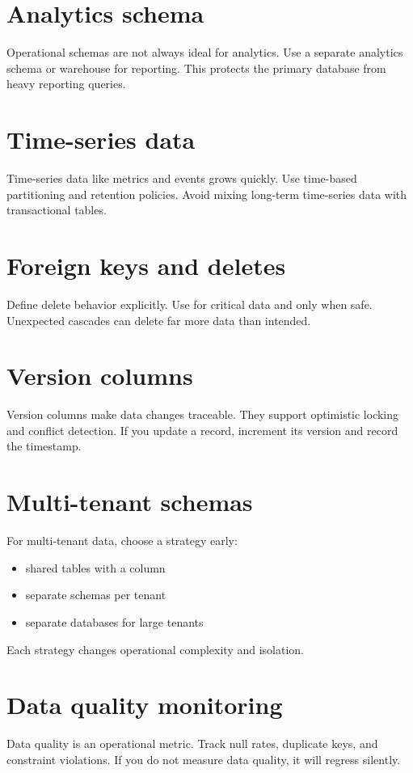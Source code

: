 \section{Analytics schema}
Operational schemas are not always ideal for analytics.
Use a separate analytics schema or warehouse for reporting.
This protects the primary database from heavy reporting queries.

\section{Time-series data}
Time-series data like metrics and events grows quickly.
Use time-based partitioning and retention policies.
Avoid mixing long-term time-series data with transactional tables.

\section{Foreign keys and deletes}
Define delete behavior explicitly.
Use  for critical data and  only when safe.
Unexpected cascades can delete far more data than intended.

\section{Version columns}
Version columns make data changes traceable.
They support optimistic locking and conflict detection.
If you update a record, increment its version and record the timestamp.

\section{Multi-tenant schemas}
For multi-tenant data, choose a strategy early:
\begin{itemize}[nosep]
  \item shared tables with a  column
  \item separate schemas per tenant
  \item separate databases for large tenants
\end{itemize}

Each strategy changes operational complexity and isolation.

\section{Data quality monitoring}
Data quality is an operational metric.
Track null rates, duplicate keys, and constraint violations.
If you do not measure data quality, it will regress silently.

